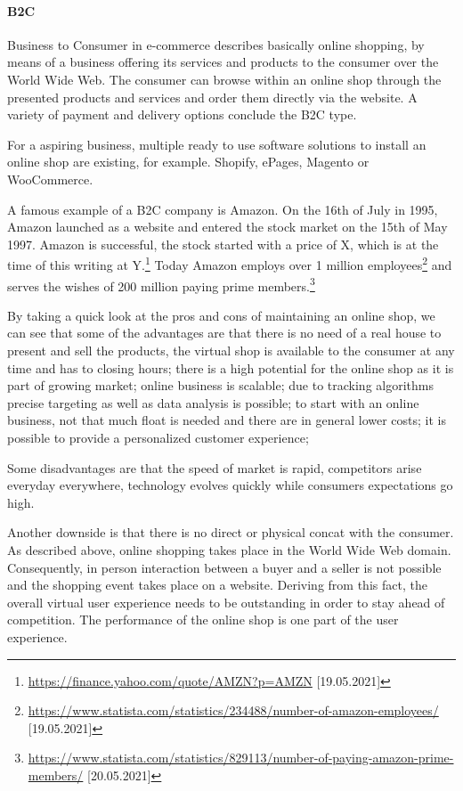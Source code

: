 \paragraph{B2C}
Business to Consumer in e-commerce describes basically online shopping, by means of a business offering its services and products to the consumer over the World Wide Web.
The consumer can browse within an online shop through the presented products and services and order them directly via the website.
A variety of payment and delivery options conclude the B2C type.

For a aspiring business, multiple ready to use software solutions to install an online shop are existing, for example. Shopify, ePages, Magento or WooCommerce. %

A famous example of a B2C company is Amazon.
On the 16th of July in 1995, Amazon launched as a website and entered the stock market on the 15th of May 1997.%
Amazon is successful, the stock started with a price of X, which is at the time of this writing at Y.\footnote{\url{https://finance.yahoo.com/quote/AMZN?p=AMZN} [19.05.2021]}
Today Amazon employs over 1 million employees\footnote{\url{https://www.statista.com/statistics/234488/number-of-amazon-employees/} [19.05.2021]} and serves the wishes of 200 million paying prime members.\footnote{\url{https://www.statista.com/statistics/829113/number-of-paying-amazon-prime-members/} [20.05.2021]}


By taking a quick look at the pros and cons of maintaining an online shop, we can see that some of the advantages are that there is no need of a real house to present and sell the products, the virtual shop is available to the consumer at any time and has to closing hours; there is a high potential for the online shop as it is part of growing market; online business is scalable; due to tracking algorithms precise targeting as well as data analysis is possible; to start with an online business, not that much float is needed and there are in general lower costs; it is possible to provide a personalized customer experience; 

Some disadvantages are that the speed of market is rapid, competitors arise everyday everywhere, technology evolves quickly while consumers expectations go high.


Another downside is that there is no direct or physical concat with the consumer.
As described above, online shopping takes place in the World Wide Web domain.
Consequently, in person interaction between a buyer and a seller is not possible and the shopping event takes place on a website.
Deriving from this fact, the overall virtual user experience needs to be outstanding in order to stay ahead of competition.
The performance of the online shop is one part of the user experience.

